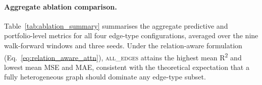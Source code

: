 \documentclass[runningheads]{llncs}
\begin{document}

\paragraph{Aggregate ablation comparison.}
Table~\ref{tab:ablation_summary} summarises the aggregate predictive and portfolio-level metrics for all four edge-type configurations, averaged over the nine walk-forward windows and three seeds. Under the relation-aware formulation (Eq.~\eqref{eq:relation_aware_attn}), \textsc{all\_edges} attains the highest mean R\textsuperscript{2} and lowest mean MSE and MAE, consistent with the theoretical expectation that a fully heterogeneous graph should dominate any edge-type subset.
\end{document}
